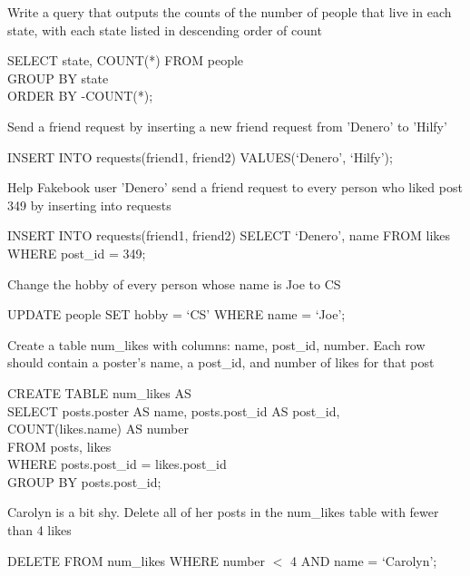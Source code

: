 \question
Write a query that outputs the counts of the number of people that live in each state, with each state listed in descending order of count

\begin{solution}[0.5in]
SELECT state, COUNT(*) FROM people\\
GROUP BY state \\
ORDER BY -COUNT(*);
\end{solution}

\question
Send a friend request by inserting a new friend request from 'Denero' to 'Hilfy'

\begin{solution}[0.5in]
INSERT INTO requests(friend1, friend2) VALUES(‘Denero’, ‘Hilfy’);
\end{solution}

\question
Help Fakebook user 'Denero' send a friend request to every person who liked post 349 by inserting into requests

\begin{solution}[0.5in]
INSERT INTO requests(friend1, friend2) SELECT ‘Denero’, name FROM likes WHERE post\_id = 349;
\end{solution}

\question
Change the hobby of every person whose name is Joe to CS

\begin{solution}[0.5in]
UPDATE people SET hobby = ‘CS’ WHERE name = ‘Joe’;
\end{solution}

\question
Create a table num\_likes with columns: name, post\_id, number. Each row should contain a poster’s name, a post\_id, and number of likes for that post

\begin{solution}[0.5in]
CREATE TABLE num\_likes AS\\
      SELECT posts.poster AS name, posts.post\_id AS post\_id, \\ COUNT(likes.name) AS number \\
      FROM posts, likes\\
	WHERE posts.post\_id = likes.post\_id\\
	GROUP BY posts.post\_id;
\end{solution}

\question
Carolyn is a bit shy. Delete all of her posts in the num\_likes table with fewer than 4 likes

\begin{solution}[0.5in]
DELETE FROM num\_likes WHERE number $<$ 4 AND name = ‘Carolyn’;
\end{solution}


